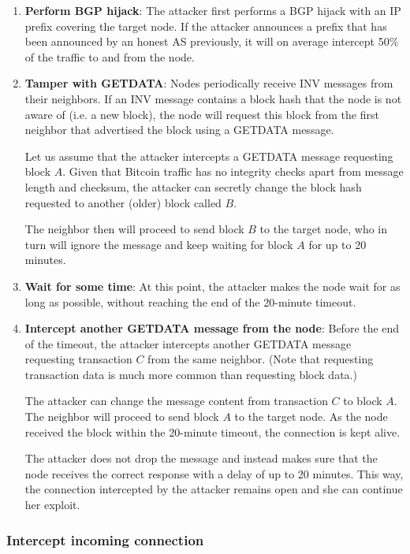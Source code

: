 \documentclass[12pt]{article}
\begin{document}
\begin{enumerate}
	\item \textbf{Perform BGP hijack}: The attacker first performs a BGP hijack with an IP prefix covering the target node. If the attacker announces a prefix that has been announced by an honest AS previously, it will on average intercept 50\% of the traffic to and from the node.
	
	\item \textbf{Tamper with GETDATA}: Nodes periodically receive INV messages from their neighbors. If an INV message contains a block hash that the node is not aware of (i.e. a new block), the node will request this block from the first neighbor that advertised the block using a GETDATA message.
	
Let us assume that the attacker intercepts a GETDATA message requesting block $A$. Given that Bitcoin traffic has no integrity checks apart from message length and checksum, the attacker can secretly change the block hash requested to another (older) block called $B$.

The neighbor then will proceed to send block $B$ to the target node, who in turn will ignore the message and keep waiting for block $A$ for up to 20 minutes.

	\item \textbf{Wait for some time}: At this point, the attacker makes the node wait for as long as possible, without reaching the end of the 20-minute timeout.

	\item \textbf{Intercept another GETDATA message from the node}: Before the end of the timeout, the attacker intercepts another GETDATA message requesting transaction $C$ from the same neighbor. (Note that requesting transaction data is much more common than requesting block data.)

The attacker can change the message content from transaction $C$ to block $A$. The neighbor will proceed to send block $A$ to the target node. As the node received the block within the 20-minute timeout, the connection is kept alive.

The attacker does not drop the message and instead makes sure that the node receives the correct response with a delay of up to 20 minutes. This way, the connection intercepted by the attacker remains open and she can continue her exploit.

\end{enumerate}

\subsubsection{Intercept incoming connection}
\end{document}
